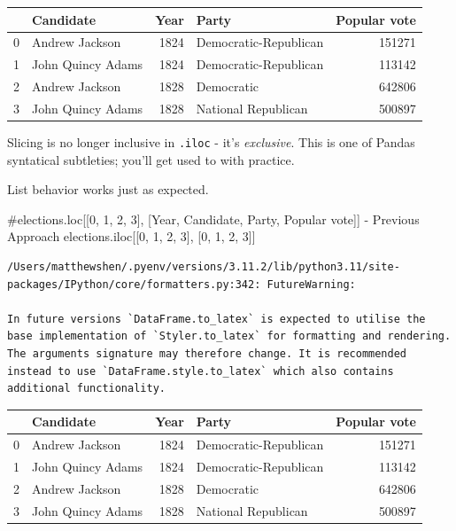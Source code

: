 \documentclass[
  letterpaper,
  DIV=11,
  numbers=noendperiod]{scrreprt}
\newenvironment{Shaded}{\begin{snugshade}}{\end{snugshade}}
\newcommand{\CommentTok}[1]{\textcolor[rgb]{0.37,0.37,0.37}{#1}}
\newcommand{\DecValTok}[1]{\textcolor[rgb]{0.68,0.00,0.00}{#1}}
\newcommand{\NormalTok}[1]{\textcolor[rgb]{0.00,0.23,0.31}{#1}}
\begin{document}
\begin{tabular}{llrlr}
\toprule
{} &          Candidate &  Year &                  Party &  Popular vote \\
\midrule
0 &     Andrew Jackson &  1824 &  Democratic-Republican &        151271 \\
1 &  John Quincy Adams &  1824 &  Democratic-Republican &        113142 \\
2 &     Andrew Jackson &  1828 &             Democratic &        642806 \\
3 &  John Quincy Adams &  1828 &    National Republican &        500897 \\
\bottomrule
\end{tabular}

Slicing is no longer inclusive in \texttt{.iloc} - it's
\emph{exclusive}. This is one of Pandas syntatical subtleties; you'll
get used to with practice.

List behavior works just as expected.

\begin{Shaded}
\begin{Highlighting}[]
\CommentTok{\#elections.loc[[0, 1, 2, 3], [\textquotesingle{}Year\textquotesingle{}, \textquotesingle{}Candidate\textquotesingle{}, \textquotesingle{}Party\textquotesingle{}, \textquotesingle{}Popular vote\textquotesingle{}]] {-} Previous Approach}
\NormalTok{elections.iloc[[}\DecValTok{0}\NormalTok{, }\DecValTok{1}\NormalTok{, }\DecValTok{2}\NormalTok{, }\DecValTok{3}\NormalTok{], [}\DecValTok{0}\NormalTok{, }\DecValTok{1}\NormalTok{, }\DecValTok{2}\NormalTok{, }\DecValTok{3}\NormalTok{]]}
\end{Highlighting}
\end{Shaded}

\begin{verbatim}
/Users/matthewshen/.pyenv/versions/3.11.2/lib/python3.11/site-packages/IPython/core/formatters.py:342: FutureWarning:

In future versions `DataFrame.to_latex` is expected to utilise the base implementation of `Styler.to_latex` for formatting and rendering. The arguments signature may therefore change. It is recommended instead to use `DataFrame.style.to_latex` which also contains additional functionality.
\end{verbatim}

\begin{tabular}{llrlr}
\toprule
{} &          Candidate &  Year &                  Party &  Popular vote \\
\midrule
0 &     Andrew Jackson &  1824 &  Democratic-Republican &        151271 \\
1 &  John Quincy Adams &  1824 &  Democratic-Republican &        113142 \\
2 &     Andrew Jackson &  1828 &             Democratic &        642806 \\
3 &  John Quincy Adams &  1828 &    National Republican &        500897 \\
\bottomrule
\end{tabular}
\end{document}
